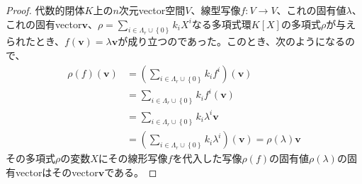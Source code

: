 \documentclass[dvipdfmx]{jsarticle}
\begin{document}
\begin{proof}
代数的閉体$K$上の$n$次元vector空間$V$、線型写像$f:V \rightarrow V$、これの固有値$\lambda$、これの固有vector$\mathbf{v}$、$\rho = \sum_{i \in \varLambda_{r} \cup \left\{ 0 \right\}} {k_{i}X^{i}}$なる多項式環$K[ X]$の多項式$\rho$が与えられたとき、$f\left( \mathbf{v} \right) = \lambda\mathbf{v}$が成り立つのであった。このとき、次のようになるので、
\begin{align*}
\rho(f)\left( \mathbf{v} \right) &= \left( \sum_{i \in \varLambda_{r} \cup \left\{ 0 \right\}} {k_{i}f^{i}} \right)\left( \mathbf{v} \right)\\
&= \sum_{i \in \varLambda_{r} \cup \left\{ 0 \right\}} {k_{i}f^{i}\left( \mathbf{v} \right)}\\
&= \sum_{i \in \varLambda_{r} \cup \left\{ 0 \right\}} {k_{i}\lambda^{i}\mathbf{v}}\\
&= \left( \sum_{i \in \varLambda_{r} \cup \left\{ 0 \right\}} {k_{i}\lambda^{i}} \right)\left( \mathbf{v} \right) = \rho(\lambda)\mathbf{v}
\end{align*}
その多項式$\rho$の変数$X$にその線形写像$f$を代入した写像$\rho(f)$の固有値$\rho(\lambda)$の固有vectorはそのvector$\mathbf{v}$である。
\end{proof}
\end{document}

